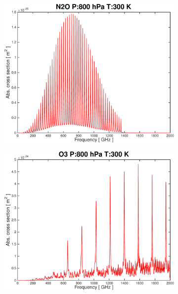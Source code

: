 \documentclass[paper=a4, fontsize=11pt]{scrartcl}
\begin{document}
\begin{figure}[ht]
\begin{subfigure}[b]{0.45\textwidth}
        \includegraphics[width=\textwidth]{plots/plot_xsec_N2O_800hPa_300K.pdf}
        \caption{}
    \end{subfigure}
    \begin{subfigure}[b]{0.45\textwidth}
        \includegraphics[width=\textwidth]{plots/plot_xsec_O3_800hPa_300K.pdf}
        \caption{}
    \end{subfigure}
    \begin{subfigure}[b]{0.45\textwidth}

\end{subfigure}
\end{figure}
\end{document}

